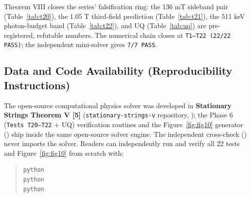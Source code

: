 \documentclass[12pt,a4paper]{article}
\begin{document}
Theorem VIII closes the series' falsification ring: the 136 mT sideband pair (Table~\ref{tab:t20}), the 1.05 T third-field prediction (Table~\ref{tab:t21}), the 511 keV photon-budget band (Table~\ref{tab:t22}), and UQ (Table~\ref{tab:uq}) are pre-registered, refutable numbers. The numerical chain closes at \texttt{T1--T22 (22/22 PASS)}; the independent mini-solver gives \texttt{7/7 PASS}.

\subsection*{Data and Code Availability (Reproducibility Instructions)}

The open-source computational physics solver was developed in \textbf{Stationary Strings Theorem V [5]} (\texttt{stationary-strings-v} repository, ); the Phase 6 (\texttt{Tests T20--T22} + UQ) verification routines and the Figure~\ref{fig:fig10} generator () ship inside the same open-source solver engine. The independent cross-check () never imports the solver. Readers can independently run and verify all 22 tests and Figure~\ref{fig:fig10} from scratch with:
\begin{quote}
\small
\texttt{python}  \\
\texttt{python}  \\
\texttt{python} 
\end{quote}
\end{document}

